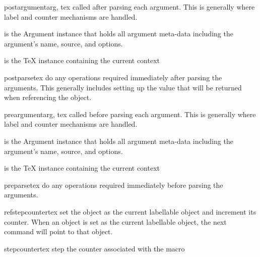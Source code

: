 \begin{methoddesc}[Macro]{postargument}{arg, tex}
called after parsing each argument. This is generally where label and
counter mechanisms are handled.

 is the Argument instance that holds all argument meta-data
    including the argument's name, source, and options.

 is the TeX instance containing the current context 
\end{methoddesc}

\begin{methoddesc}[Macro]{postparse}{tex}
do any operations required immediately after parsing the arguments.  This
generally includes setting up the value that will be returned when 
referencing the object.
\end{methoddesc}

\begin{methoddesc}[Macro]{preargument}{arg, tex}
called before parsing each argument.  This is generally where label and
counter mechanisms are handled.

 is the Argument instance that holds all argument meta-data
    including the argument's name, source, and options.

 is the TeX instance containing the current context 
\end{methoddesc}

\begin{methoddesc}[Macro]{preparse}{tex}
do any operations required immediately before parsing the arguments.
\end{methoddesc}

\begin{methoddesc}[Macro]{refstepcounter}{tex}
set the object as the current labellable object and increment its counter.
When an object is set as the current labellable object, the next 
 command will point to that object.
\end{methoddesc}

\begin{methoddesc}[Macro]{stepcounter}{tex}
step the counter associated with the macro
\end{methoddesc}

